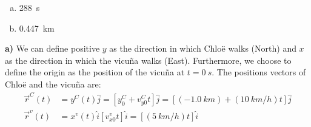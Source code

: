 \begin{finalanswer}
\begin{enumerate}[(a)]
\item \SI{288}{s}
\item \SI{0.447}{km}
\end{enumerate}
\end{finalanswer}
\begin{solution}
\textbf{a)}
We can define positive $y$ as the direction in which Chlo\"e walks (North) and $x$ as the direction in which the vicu\~na walks (East). Furthermore, we choose to define the origin as the position of the vicu\~na at $t=\SI{0}{s}$. The positions vectors of Chlo\"e and the vicu\~na are:
\begin{align*}
\vec r^C(t)&=y^C(t)\hat j=[y^C_0+v^C_{y0}t]\hat j=[(\SI{-1.0}{km})+(\SI{10}{km/h})t]\hat j\\
\vec r^v(t)&=x^v(t)\hat i[v^v_{x0}t]\hat i=[(\SI{5}{km/h})t]\hat i\\
\end{align*}


\end{solution}
